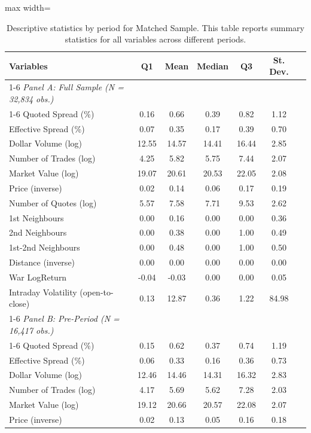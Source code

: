 \begin{table}[!htp]
\centering
\caption{Descriptive statistics by period for Matched Sample. This table reports summary statistics for all variables across different periods.}
\label{tab:descriptives_psm}
\begin{adjustbox}{max width=\textwidth}
\scriptsize
\begin{tabular}{lcccccc}
\toprule
Variables  & Q1 & Mean & Median & Q3 & St. Dev.  \\
\cmidrule{1-6}
\textit{Panel A: Full Sample (N = 32,834 obs.)} \\
\cmidrule{1-6}
Quoted Spread (\%) & 0.16 & 0.66 & 0.39 & 0.82 & 1.12 &  \\
Effective Spread (\%) & 0.07 & 0.35 & 0.17 & 0.39 & 0.70 &  \\
Dollar Volume (log) & 12.55 & 14.57 & 14.41 & 16.44 & 2.85 &  \\
Number of Trades (log) & 4.25 & 5.82 & 5.75 & 7.44 & 2.07 &  \\
Market Value (log) & 19.07 & 20.61 & 20.53 & 22.05 & 2.08 &  \\
Price (inverse) & 0.02 & 0.14 & 0.06 & 0.17 & 0.19 &  \\
Number of Quotes (log) & 5.57 & 7.58 & 7.71 & 9.53 & 2.62 &  \\
1st Neighbours & 0.00 & 0.16 & 0.00 & 0.00 & 0.36 &  \\
2nd Neighbours & 0.00 & 0.38 & 0.00 & 1.00 & 0.49 &  \\
1st-2nd Neighbours & 0.00 & 0.48 & 0.00 & 1.00 & 0.50 &  \\
Distance (inverse) & 0.00 & 0.00 & 0.00 & 0.00 & 0.00 &  \\
War LogReturn & -0.04 & -0.03 & 0.00 & 0.00 & 0.05 &  \\
Intraday Volatility (open-to-close) & 0.13 & 12.87 & 0.36 & 1.22 & 84.98 &  \\
\cmidrule{1-6}
\textit{Panel B: Pre-Period (N = 16,417 obs.)} \\
\cmidrule{1-6}
Quoted Spread (\%) & 0.15 & 0.62 & 0.37 & 0.74 & 1.19 &  \\
Effective Spread (\%) & 0.06 & 0.33 & 0.16 & 0.36 & 0.73 &  \\
Dollar Volume (log) & 12.46 & 14.46 & 14.31 & 16.32 & 2.83 &  \\
Number of Trades (log) & 4.17 & 5.69 & 5.62 & 7.28 & 2.03 &  \\
Market Value (log) & 19.12 & 20.66 & 20.57 & 22.08 & 2.07 &  \\
Price (inverse) & 0.02 & 0.13 & 0.05 & 0.16 & 0.18 &  \\

\end{tabular}
\end{adjustbox}
\end{table}
